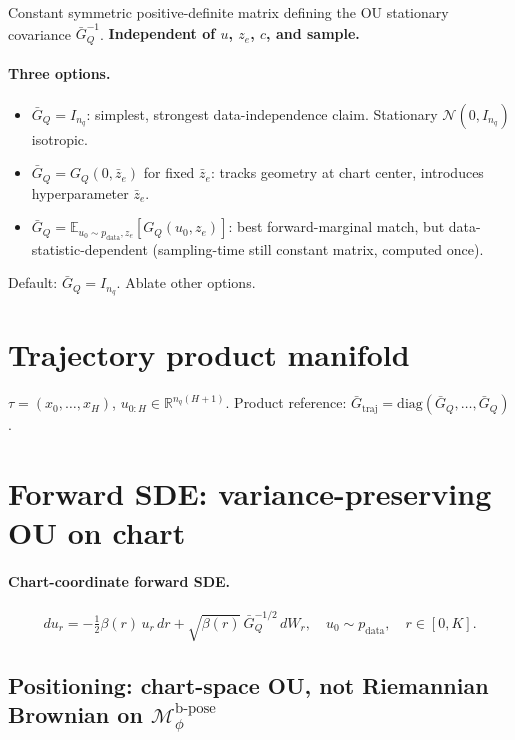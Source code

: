\documentclass[11pt,a4paper]{article}
\newcommand{\R}{\mathbb{R}}
\newcommand{\E}{\mathbb{E}}
\newcommand{\N}{\mathcal{N}}
\newcommand{\Mbpose}{\mathcal{M}_\phi^{\text{b-pose}}}
\newcommand{\GQ}{G_Q}
\newcommand{\GQbar}{\bar G_Q}
\begin{document}
Constant symmetric positive-definite matrix defining the OU stationary covariance $\GQbar^{-1}$. \textbf{Independent of $u$, $z_e$, $c$, and sample.}

\paragraph{Three options.}
\begin{itemize}[noitemsep]
    \item $\GQbar = I_{n_q}$: simplest, strongest data-independence claim. Stationary $\N(0, I_{n_q})$ isotropic.
    \item $\GQbar = \GQ(0, \bar z_e)$ for fixed $\bar z_e$: tracks geometry at chart center, introduces hyperparameter $\bar z_e$.
    \item $\GQbar = \E_{u_0 \sim p_\text{data}, z_e}[\GQ(u_0, z_e)]$: best forward-marginal match, but data-statistic-dependent (sampling-time still constant matrix, computed once).
\end{itemize}
Default: $\GQbar = I_{n_q}$. Ablate other options.

\section{Trajectory product manifold}
\label{sec:product-manifold}

$\tau = (x_0, \ldots, x_H)$, $u_{0:H} \in \R^{n_q(H+1)}$. Product reference: $\bar G_\text{traj} = \mathrm{diag}(\GQbar, \ldots, \GQbar)$.

\section{Forward SDE: variance-preserving OU on chart}
\label{sec:forward-sde}

\paragraph{Chart-coordinate forward SDE.}
\begin{equation}
\boxed{ du_r = -\tfrac{1}{2}\beta(r)\, u_r\, dr + \sqrt{\beta(r)}\, \GQbar^{-1/2}\, dW_r, \quad u_0 \sim p_\text{data}, \quad r \in [0, K]. }
\end{equation}

\subsection{Positioning: chart-space OU, not Riemannian Brownian on \texorpdfstring{$\Mbpose$}{M}}
\label{sec:forward-sde-positioning}
\end{document}
